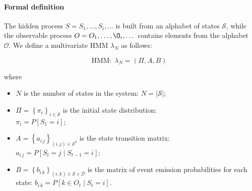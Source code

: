 

\paragraph*{Formal definition} 

The hidden process $S=S_1,\dots,S_i, \dots$ is built from an alphabet of states $\mathcal{S}$, while the observable process $O=O_1, \dots, \O_i, \dots$ contains elements from the alphabet $\mathcal{O}$. We define a multivariate HMM $\lambda_N$ as follows:

$$\text{HMM}:\;\lambda_N=(\Pi, A, B)$$

where 
\begin{itemize}
	\item $N$ is the number of states in the system:
	$N = \left| \mathcal{S} \right|$;

	\item $\Pi=\left\{ \pi_i\right\}_{i\in\mathcal{S}}$ is the initial state distribution:\\
	$\pi_i=P[S_1=i]$;

	\item $A = \left\{ a_{i\,j}\right\}_{(i,j)\in\mathcal{S}^2}$ is the state transition matrix:\\
	$a_{i\,j}=P[S_t=j \mid S_{t-1}=i]$;

	\item $B = \left\{ b_{i\,k}\right\}_{(i,k)\in\mathcal{S}\times\mathcal{D}}$ is the matrix of event emission probabilities for each state:
	$b_{i\,k} = P[ k \in O_t \mid S_t = i]$.
\end{itemize}

